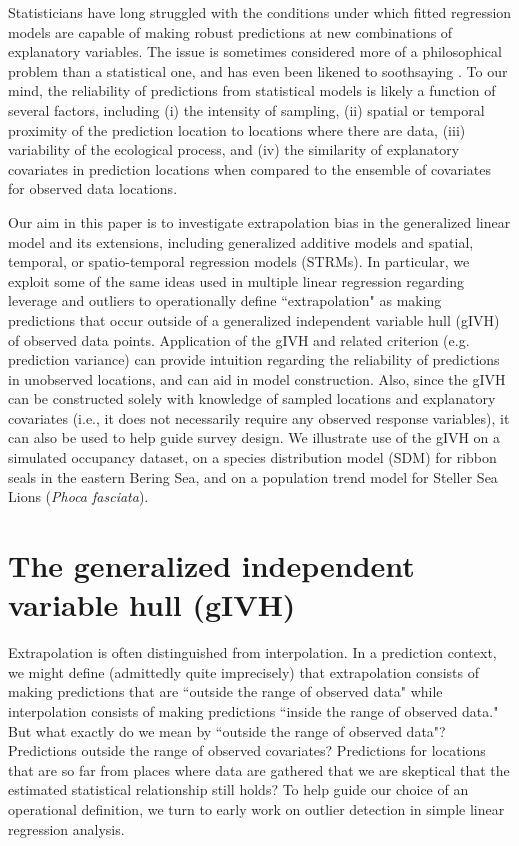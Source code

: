 \documentclass[12pt,english]{article}
\begin{document}
\begin{spacing}{1.9}
Statisticians have long struggled with the conditions under which fitted regression models are capable of
making robust predictions at new combinations of explanatory variables.  The issue is sometimes considered more of a
philosophical problem than a statistical one, and has even been likened to soothsaying \citep{EhrenbergBound1993}.  To our mind, the reliability of predictions from statistical models is likely a function of several factors, including (i) the intensity of sampling,
(ii) spatial or temporal proximity of the prediction location to locations where there are data, (iii) variability of the ecological process, and (iv) the similarity of explanatory covariates in prediction locations when compared to the ensemble of covariates for observed data locations.

Our aim in this paper is to investigate extrapolation bias in the generalized linear model and its extensions, including generalized additive models \citep[GAMs;][]{HastieTibshirani1999,Wood2006} and spatial, temporal, or spatio-temporal regression models (STRMs).  In particular, we exploit some of the same ideas used in multiple linear regression regarding leverage and outliers \citep{Cook1979} to operationally define ``extrapolation" as making predictions that occur outside of a generalized independent variable hull (gIVH) of observed data points. Application of the gIVH and related criterion (e.g. prediction variance) can provide intuition regarding the reliability of predictions in unobserved locations, and can aid in model construction.  Also, since the gIVH can be constructed solely with knowledge of sampled locations and explanatory covariates (i.e., it does not necessarily require any observed response variables), it can also be used to help guide survey design. We illustrate use of the gIVH on a simulated occupancy dataset, on a species distribution model (SDM) for ribbon seals in the eastern Bering Sea, and on a population trend model for Steller Sea Lions ({\it Phoca fasciata}).

\section{The generalized independent variable hull (gIVH)}

Extrapolation is often distinguished from interpolation.  In a prediction context, we might define (admittedly quite imprecisely) that extrapolation consists of making predictions that are ``outside the range of observed data" while interpolation consists of making predictions ``inside the range of observed data."  But what exactly do we mean by ``outside the range of observed data"?  Predictions outside the range of observed covariates?  Predictions for locations that are so far from places where data are gathered that we are skeptical that the estimated statistical relationship still holds? To help guide our choice of an operational definition, we turn to early work on outlier detection in simple linear regression analysis.


\end{spacing}
\end{document}

